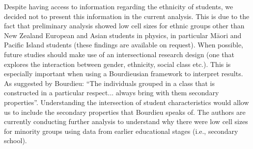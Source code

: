 Despite having access to information regarding the ethnicity of students, we decided not to present this information in the current analysis. This is due to the fact that preliminary analysis showed low cell sizes for ethnic groups other than New Zealand European and Asian students in physics, in particular M\={a}ori and Pacific Island students (these findings are available on request). When possible, future studies should make use of an intersectional research design (one that explores the interaction between gender, ethnicity, social class etc.). This is especially important when using a Bourdieusian framework to interpret results. As suggested by Bourdieu: ``The individuals grouped in a class that is constructed in a particular respect... always bring with them secondary properties''.\cite{Bourdieu1984} Understanding the intersection of student characteristics would allow us to include the secondary properties that Bourdieu speaks of. The authors are currently conducting further analysis to understand why there were low cell sizes for minority groups using data from earlier educational stages (i.e., secondary school). 


